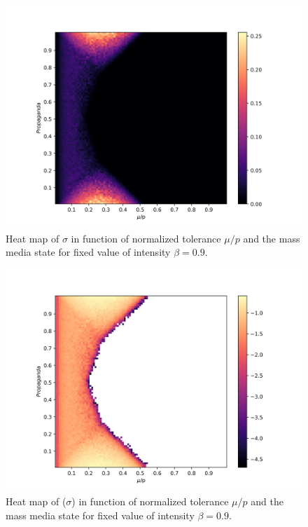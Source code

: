 \documentclass[%
 reprint,
 amsmath,amssymb,
 aps,
]{revtex4-2}
\begin{document}
\begin{figure}
    \centering
    \includegraphics[scale = 0.45]{images/sigma_prop_vs_mu_n1000_p100_i09.png}
    \caption{Heat map of $\sigma$ in function of normalized tolerance $\mu/p$ and the mass media state for fixed value of intensity $\beta = 0.9$.}
    \label{fig:sigma_prop_vs_tolerance_i09}
\end{figure}
\begin{figure}
    \centering
    \includegraphics[scale = 0.45]{images/log_sigma_prop_vs_mu_n1000_p100_i09.png}
    \caption{Heat map of \log($\sigma$) in function of normalized tolerance $\mu/p$ and the mass media state for fixed value of intensity $\beta = 0.9$.}
    \label{fig:logsigma_prop_vs_tolerance_i09}
\end{figure}
\end{document}
